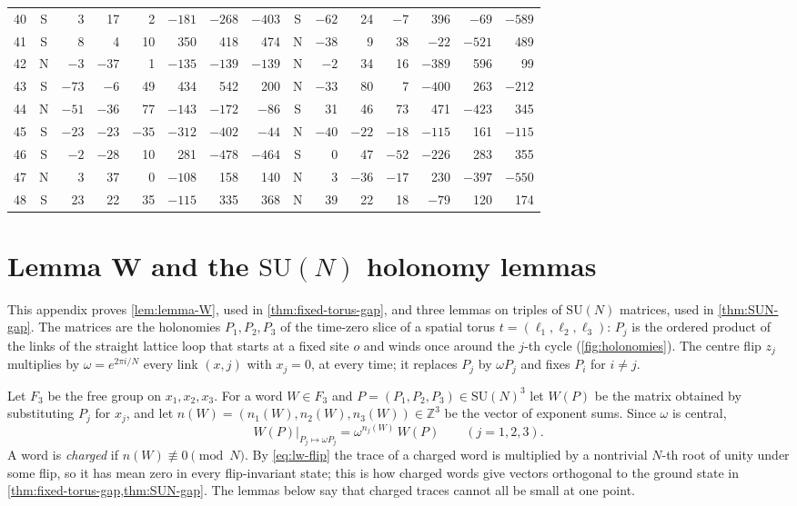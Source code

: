 \documentclass[11pt,a4paper]{amsart}
\theoremstyle{definition}
\theoremstyle{remark}
\numberwithin{equation}{section}
\newcommand{\Z}{\mathbb{Z}}          %
\newcommand{\SU}{\mathrm{SU}}              %
\begin{document}
\begin{table}[!htbp]
\begin{tabular}{@{}r@{\quad}c*{6}{r}@{\quad}c*{6}{r}@{}}
40 & S & 3 & 17 & 2 & $-181$ & $-268$ & $-403$ & S & $-62$ & 24 & $-7$ & 396 & $-69$ & $-589$\\
41 & S & 8 & 4 & 10 & 350 & 418 & 474 & N & $-38$ & 9 & 38 & $-22$ & $-521$ & 489\\
42 & N & $-3$ & $-37$ & 1 & $-135$ & $-139$ & $-139$ & N & $-2$ & 34 & 16 & $-389$ & 596 & 99\\
43 & S & $-73$ & $-6$ & 49 & 434 & 542 & 200 & N & $-33$ & 80 & 7 & $-400$ & 263 & $-212$\\
44 & N & $-51$ & $-36$ & 77 & $-143$ & $-172$ & $-86$ & S & 31 & 46 & 73 & 471 & $-423$ & 345\\
45 & S & $-23$ & $-23$ & $-35$ & $-312$ & $-402$ & $-44$ & N & $-40$ & $-22$ & $-18$ & $-115$ & 161 & $-115$\\
46 & S & $-2$ & $-28$ & 10 & 281 & $-478$ & $-464$ & S & 0 & 47 & $-52$ & $-226$ & 283 & 355\\
47 & N & 3 & 37 & 0 & $-108$ & 158 & 140 & N & 3 & $-36$ & $-17$ & 230 & $-397$ & $-550$\\
48 & S & 23 & 22 & 35 & $-115$ & 335 & 368 & N & 39 & 22 & 18 & $-79$ & 120 & 174\\
\bottomrule
\end{tabular}
\end{table}
\section{Lemma W and the \texorpdfstring{$\SU(N)$}{SU(N)} holonomy lemmas}\label{app:lemma-W}

This appendix proves \cref{lem:lemma-W}, used in \cref{thm:fixed-torus-gap}, and three lemmas on triples of $\SU(N)$ matrices, used in \cref{thm:SUN-gap}. The matrices are the holonomies $P_1,P_2,P_3$ of the time-zero slice of a spatial torus $t=(\ell_1,\ell_2,\ell_3)$: $P_j$ is the ordered product of the links of the straight lattice loop that starts at a fixed site $o$ and winds once around the $j$-th cycle (\cref{fig:holonomies}). The centre flip $z_j$ multiplies by $\omega=e^{2\pi i/N}$ every link $(x,j)$ with $x_j=0$, at every time; it replaces $P_j$ by $\omega P_j$ and fixes $P_i$ for $i\neq j$.

Let $F_3$ be the free group on $x_1,x_2,x_3$. For a word $W\in F_3$ and $P=(P_1,P_2,P_3)\in\SU(N)^3$ let $W(P)$ be the matrix obtained by substituting $P_j$ for $x_j$, and let $n(W)=(n_1(W),n_2(W),n_3(W))\in\Z^3$ be the vector of exponent sums. Since $\omega$ is central,
\begin{equation}\label{eq:lw-flip}
W(P)\big|_{P_j\mapsto\omega P_j}=\omega^{n_j(W)}\,W(P)\qquad(j=1,2,3).
\end{equation}
A word is \emph{charged} if $n(W)\not\equiv0\pmod N$. By \eqref{eq:lw-flip} the trace of a charged word is multiplied by a nontrivial $N$-th root of unity under some flip, so it has mean zero in every flip-invariant state; this is how charged words give vectors orthogonal to the ground state in \cref{thm:fixed-torus-gap,thm:SUN-gap}. The lemmas below say that charged traces cannot all be small at one point.
\end{document}
